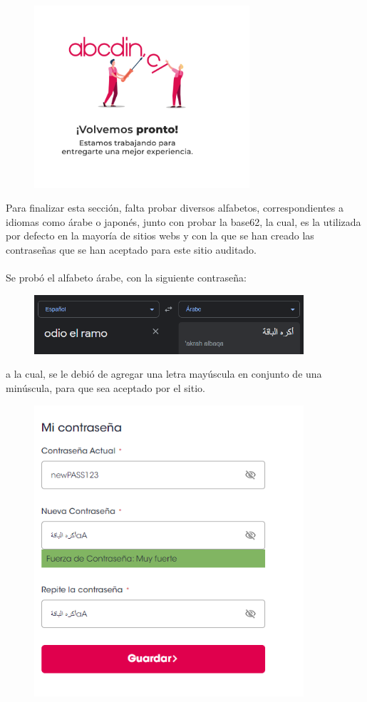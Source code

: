 \documentclass{article}
\begin{document}
\begin{figure}
    \centering
    \includegraphics[width=8cm]{caidabcdin.PNG}
\end{figure}
\newpage
Para finalizar esta sección, falta probar diversos alfabetos, correspondientes a idiomas como árabe o japonés, junto con probar la base62, la cual, es la utilizada por defecto en la mayoría de sitios webs y con la que se han creado las contraseñas que  se han aceptado para este sitio auditado.
\\\\
Se probó el alfabeto árabe, con la siguiente contraseña: 
\begin{figure}[h]
    \centering
    \includegraphics[width=10cm]{arabe.PNG}
\end{figure}
a la cual, se le debió de agregar una letra mayúscula en conjunto de una minúscula, para que sea aceptado por el sitio. 
\begin{figure}[h]
    \centering
    \includegraphics[width=10cm]{passarabe.PNG}
\end{figure}
\end{document}
